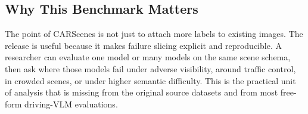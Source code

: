 \subsection{Why This Benchmark Matters}
The point of CARScenes is not just to attach more labels to existing images. The release is useful because it makes failure slicing explicit and reproducible. A researcher can evaluate one model or many models on the same scene schema, then ask where those models fail under adverse visibility, around traffic control, in crowded scenes, or under higher semantic difficulty. This is the practical unit of analysis that is missing from the original source datasets and from most free-form driving-VLM evaluations.
